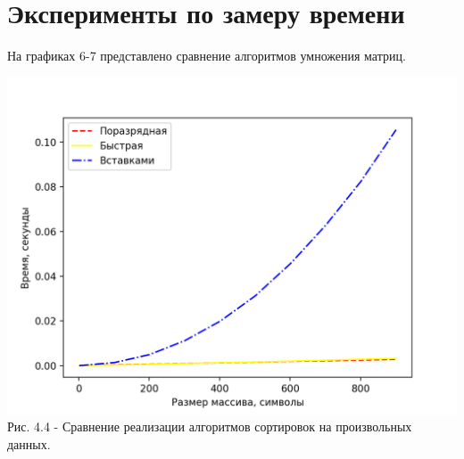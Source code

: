 \newpage
\section{Эксперименты по замеру времени}
На графиках 6-7 представлено сравнение алгоритмов умножения матриц. 
	\begin{center}
        		\includegraphics[scale = 1]{./pictures/graph1} \\ Рис. 4.4 - Сравнение реализации алгоритмов сортировок на произвольных данных.
	\end{center}
	

